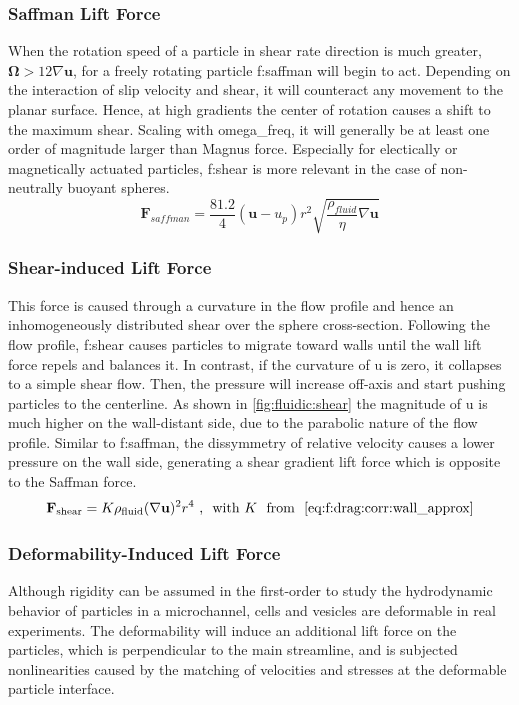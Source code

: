 \subsubsection{Saffman Lift Force}
When the rotation speed of a particle in shear rate direction is much greater, $\mathbf{\Omega}>12\nabla\mathbf{u}$, for a freely rotating particle \gls{f:saffman} will begin to act. Depending on the interaction of slip velocity and shear, it will counteract any movement to the planar surface. Hence, at high gradients the center of rotation causes a shift to the maximum shear. \newline 
Scaling with \gls{omega_freq}, it will generally be at least one order of magnitude larger than Magnus force. Especially for electically or magnetically actuated particles, \gls{f:shear} is more relevant in the case of non-neutrally buoyant spheres.\cite{lit:fluidic:inertialFluidicsForces} 
\begin{equation}	
	\mathbf{F}_{saffman} = \frac{81.2}{4} (\mathbf{u} - u_p) r^2 \sqrt{\frac{\rho_{fluid}}{\eta} \nabla \mathbf{u}} \label{eq:f:saffman}
\end{equation}

\subsubsection{Shear-induced Lift Force}
This force is caused through a curvature in the flow profile and hence an inhomogeneously distributed shear over the sphere cross-section. Following the flow profile, \gls{f:shear} causes particles to migrate toward walls until the wall lift force repels and balances it. In contrast, if the curvature of \gls{u} is zero, it collapses to a simple shear flow. Then, the pressure will increase off-axis and start pushing particles to the centerline. As shown in \cref{fig:fluidic:shear} the magnitude of \gls{u} is much higher on the wall-distant side, due to the parabolic nature of the flow profile. Similar to \gls{f:saffman},  the  dissymmetry  of  relative  velocity  causes  a  lower  pressure  on the wall side, generating a shear gradient lift force which is opposite to the Saffman force.\cite{lit:fluidic:inertialFluidicsForces} 
\begin{equation}	
	\mathbf{F}_\text{shear} = K \rho_\text{fluid} (\nabla \mathbf{u})^2 r^4\ \text{, \ with\ } K \ \text{ from }\  \cref{eq:f:drag:corr:wall_approx} \label{eq:f:shear}
\end{equation}

\subsubsection{Deformability-Induced Lift Force}
Although rigidity can be assumed in the first-order to study the hydrodynamic behavior of particles in a microchannel, cells and vesicles are deformable in real experiments. The deformability  will  induce an additional  lift  force on the particles, which is perpendicular to the main streamline, and is subjected nonlinearities  caused  by  the matching   of   velocities   and   stresses   at   the   deformable   particle interface. 

